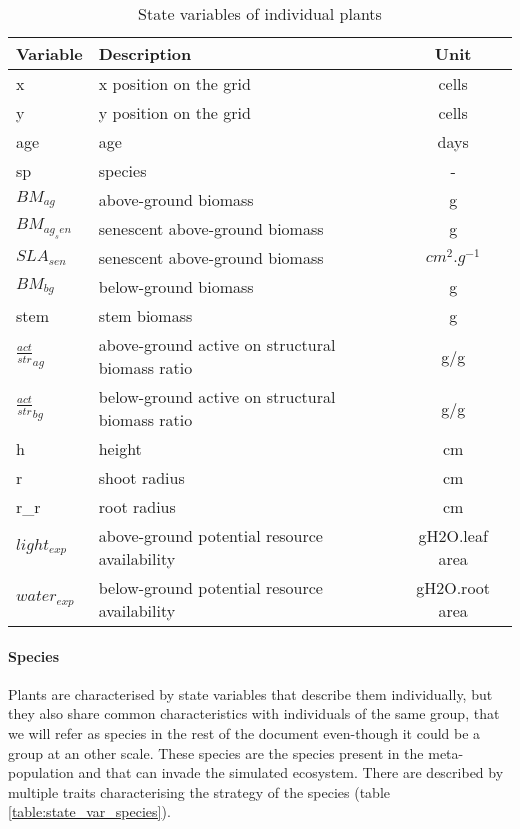 \documentclass[a4paper,twoside, justified,marginals=raggedright]{tufte-handout}
\begin{document}
\begin{table*}
\caption{State variables of individual plants} 
\label{table:state_var_plant}
\begin{tabular}{l|l|c}
Variable & Description & Unit \\ 
\hline 
x & x position on the grid & cells \\
y & y position on the grid & cells \\
age & age & days \\
sp & species & - \\
$BM_{ag}$ & above-ground biomass & g \\
$BM_{ag_sen}$ & senescent above-ground biomass & g \\
$SLA_{sen}$ & senescent above-ground biomass & $cm^{2}.g^{-1}$ \\
$BM_{bg}$ & below-ground biomass & g \\
stem & stem biomass & g \\
$\frac{act}{str}_{ag}$ & above-ground active on structural biomass ratio & g/g \\
$\frac{act}{str}_{bg}$ & below-ground active on structural biomass ratio & g/g \\
h & height & cm \\
r & shoot radius & cm \\
r\_r & root radius & cm \\ 
$light_{exp}$ & above-ground potential resource availability & gH2O.leaf area\\
$water_{exp}$ & below-ground potential resource availability & gH2O.root area\\
\end{tabular} 
\vspace*{0.5cm}
\end{table*}


\paragraph{Species} Plants are characterised by state variables that describe them individually, but they also share common characteristics with individuals of the same group, that we will refer as species in the rest of the document even-though it could be a group at an other scale. These species are the species present in the meta-population and that can invade the simulated ecosystem. There are described by multiple traits characterising the strategy of the species (table \ref{table:state_var_species}).
\end{document}
